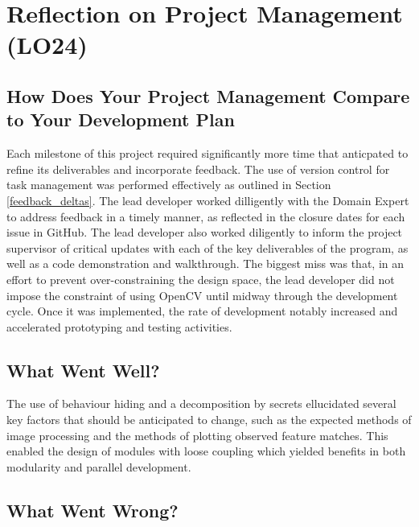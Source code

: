 \documentclass{article}
\begin{document}
\section{Reflection on Project Management (LO24)}


\subsection{How Does Your Project Management Compare to Your Development Plan}
Each milestone of this project required significantly more time that anticpated to refine its deliverables and incorporate feedback. The use of version control for task management was performed effectively as outlined in Section \ref{feedback_deltas}. The lead developer worked dilligently with the Domain Expert to address feedback in a timely manner, as reflected in the closure dates for each issue in GitHub. The lead developer also worked diligently to inform the project supervisor of critical updates with each of the key deliverables of the program, as well as a code demonstration and walkthrough. The biggest miss was that, in an effort to prevent over-constraining the design space, the lead developer did not impose the constraint of using OpenCV until midway through the development cycle. Once it was implemented, the rate of development notably increased and accelerated prototyping and testing activities.

\subsection{What Went Well?}
The use of behaviour hiding and a decomposition by secrets ellucidated several key factors that should be anticipated to change, such as the expected methods of image processing and the methods of plotting observed feature matches. This enabled the design of modules with loose coupling which yielded benefits in both modularity and parallel development.

\subsection{What Went Wrong?}
\end{document}
